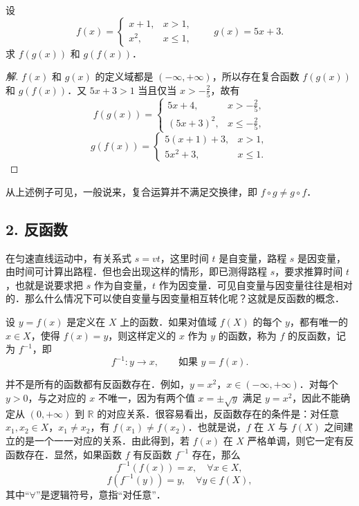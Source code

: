 \begin{example}\label{ex:2-2-1}
设
\[
f(x)=\begin{cases}
x+1, & x>1,\\
x^2, & x\leqslant1,
\end{cases}\qquad g(x)=5x+3.
\]
求 $f(g(x))$ 和 $g(f(x))$．
\end{example}

\begin{proof}[解]
$f(x)$ 和 $g(x)$ 的定义域都是 $(-\infty,+\infty)$，所以存在复合函数 $f(g(x))$ 和 $g(f(x))$．又 $5x+3>1$ 当且仅当 $x>-\frac{2}{5}$，故有
\[
f(g(x))=\begin{cases}
5x+4, & x>-\frac{2}{5},\\
(5x+3)^2, & x\leqslant-\frac{2}{5},
\end{cases}
\]
\[
g(f(x))=\begin{cases}
5(x+1)+3, & x>1,\\
5x^2+3, & x\leqslant1.
\end{cases}
\]
\end{proof}

从上述例子可见，一般说来，复合运算并不满足交换律，即 $f\circ g\neq g\circ f$．

\subsection*{2. 反函数}

在匀速直线运动中，有关系式 $s=vt$，这里时间 $t$ 是自变量，路程 $s$ 是因变量，由时间可计算出路程．但也会出现这样的情形，即已测得路程 $s$，要求推算时间 $t$，也就是说要求把 $s$ 作为自变量，$t$ 作为因变量．可见自变量与因变量往往是相对的．那么什么情况下可以使自变量与因变量相互转化呢？这就是反函数的概念．

\begin{definition}\label{def:2-7}
设 $y=f(x)$ 是定义在 $X$ 上的函数．如果对值域 $f(X)$ 的每个 $y$，都有唯一的 $x\in X$，使得 $f(x)=y$，则这样定义的 $x$ 作为 $y$ 的函数，称为 $f$ 的反函数，记为 $f^{-1}$，即
\[
f^{-1}\colon y\to x,\qquad \text{如果 } y=f(x).
\]
\end{definition}

并不是所有的函数都有反函数存在．例如，$y=x^2$，$x\in(-\infty,+\infty)$．对每个 $y>0$，与之对应的 $x$ 不唯一，因为有两个值 $x=\pm\sqrt{y}$ 满足 $y=x^2$，因此不能确定从 $(0,+\infty)$ 到 $\mathbb{R}$ 的对应关系．很容易看出，反函数存在的条件是：对任意 $x_1,x_2\in X$，$x_1\neq x_2$，有 $f(x_1)\neq f(x_2)$．也就是说，$f$ 在 $X$ 与 $f(X)$ 之间建立的是一个一一对应的关系．由此得到，若 $f(x)$ 在 $X$ 严格单调，则它一定有反函数存在．显然，如果函数 $f$ 有反函数 $f^{-1}$ 存在，那么
\[
f^{-1}(f(x))=x,\quad \forall x\in X,
\]
\[
f(f^{-1}(y))=y,\quad \forall y\in f(X),
\]
其中“$\forall$”是逻辑符号，意指“对任意”．

